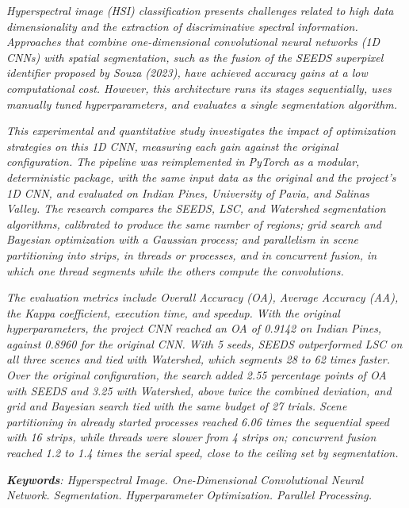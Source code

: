 \begin{Abstract}
\textit{Hyperspectral image (HSI) classification presents challenges related to high data dimensionality and the extraction of discriminative spectral information. Approaches that combine one-dimensional convolutional neural networks (1D CNNs) with spatial segmentation, such as the fusion of the SEEDS superpixel identifier proposed by Souza (2023), have achieved accuracy gains at a low computational cost. However, this architecture runs its stages sequentially, uses manually tuned hyperparameters, and evaluates a single segmentation algorithm.}

\textit{This experimental and quantitative study investigates the impact of optimization strategies on this 1D CNN, measuring each gain against the original configuration. The pipeline was reimplemented in PyTorch as a modular, deterministic package, with the same input data as the original and the project's 1D CNN, and evaluated on Indian Pines, University of Pavia, and Salinas Valley. The research compares the SEEDS, LSC, and Watershed segmentation algorithms, calibrated to produce the same number of regions; grid search and Bayesian optimization with a Gaussian process; and parallelism in scene partitioning into strips, in threads or processes, and in concurrent fusion, in which one thread segments while the others compute the convolutions.}

\textit{The evaluation metrics include Overall Accuracy (OA), Average Accuracy (AA), the Kappa coefficient, execution time, and speedup. With the original hyperparameters, the project CNN reached an OA of 0.9142 on Indian Pines, against 0.8960 for the original CNN. With 5 seeds, SEEDS outperformed LSC on all three scenes and tied with Watershed, which segments 28 to 62 times faster. Over the original configuration, the search added 2.55 percentage points of OA with SEEDS and 3.25 with Watershed, above twice the combined deviation, and grid and Bayesian search tied with the same budget of 27 trials. Scene partitioning in already started processes reached 6.06 times the sequential speed with 16 strips, while threads were slower from 4 strips on; concurrent fusion reached 1.2 to 1.4 times the serial speed, close to the ceiling set by segmentation.}

\textit{\textbf{Keywords}: Hyperspectral Image. One-Dimensional Convolutional Neural Network. Segmentation. Hyperparameter Optimization. Parallel Processing.}
\end{Abstract}

